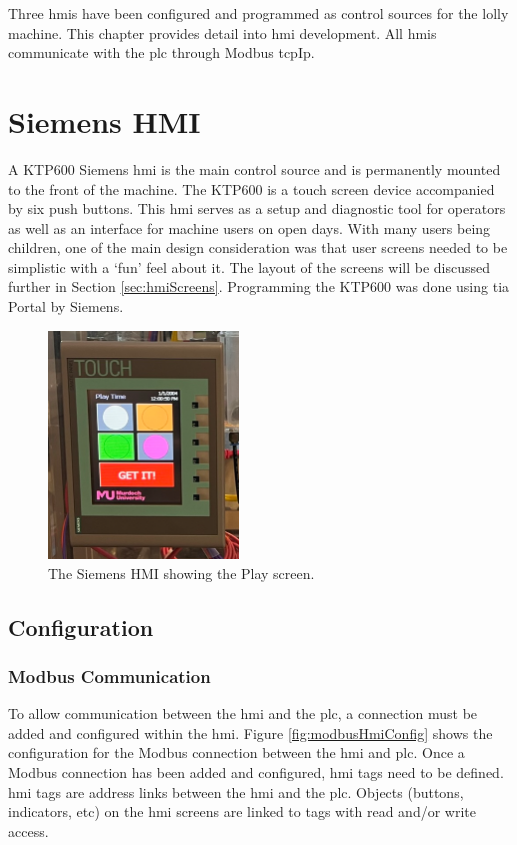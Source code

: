 Three \acrshort{hmi}s have been configured and programmed as control sources for the lolly machine. This chapter provides detail into \acrshort{hmi} development. All \acrshort{hmi}s communicate with the \acrshort{plc} through Modbus \acrshort{tcpIp}.

\section{Siemens HMI}
    A KTP600 Siemens \acrshort{hmi} is the main control source and is permanently mounted to the front of the machine. The KTP600 is a touch screen device accompanied by six push buttons.  This \acrshort{hmi} serves as a setup and diagnostic tool for operators as well as an interface for machine users on open days. With many users being children, one of the main design consideration was that user screens needed to be simplistic with a `fun' feel about it. The layout of the screens will be discussed further in Section \ref{sec:hmiScreens}. Programming the KTP600 was done using \acrfull{tia} Portal by Siemens.

        \begin{figure}[H]
            \centering
            \includegraphics[width = 0.45\textwidth]{2_images/hmiInstalled}
            \caption{The Siemens HMI showing the Play screen.}
            \label{fig:hmiInstalled}
        \end{figure}    
    
    \subsection{Configuration}
        \subsubsection{Modbus Communication}
            To allow communication between the \acrshort{hmi} and the \acrshort{plc}, a connection must be added and configured within the \acrshort{hmi}. Figure \ref{fig:modbusHmiConfig} shows the configuration for the Modbus connection between the \acrshort{hmi} and \acrshort{plc}. Once a Modbus connection has been added and configured, \acrshort{hmi} tags need to be defined. \acrshort{hmi} tags are address links between the \acrshort{hmi} and the \acrshort{plc}. Objects (buttons, indicators, etc) on the \acrshort{hmi} screens are linked to tags with read and/or write access. 
            
